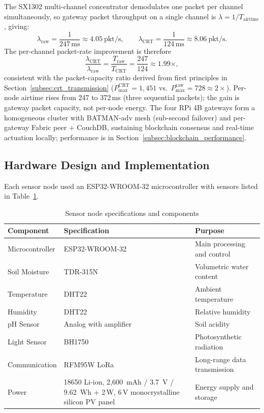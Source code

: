 \documentclass[pdflatex,sn-mathphys-num]{sn-jnl}
\theoremstyle{thmstyleone}
\theoremstyle{thmstyletwo}
\theoremstyle{thmstylethree}
\begin{document}
The SX1302 multi-channel concentrator demodulates one packet per channel simultaneously, so gateway packet throughput on a single channel is $\lambda = 1/T_{\text{airtime}}$, giving:
\begin{equation}
\lambda_{\text{raw}} = \frac{1}{247\,\text{ms}} \approx 4.05\ \text{pkt/s}, \qquad
\lambda_{\text{CRT}} = \frac{1}{124\,\text{ms}} \approx 8.06\ \text{pkt/s}.
\label{eq:packet_rates}
\end{equation}
The per-channel packet-rate improvement is therefore
\begin{equation}
\frac{\lambda_{\text{CRT}}}{\lambda_{\text{raw}}} = \frac{T_{\text{raw}}}{T_{\text{CRT}}} = \frac{247}{124} \approx 1.99\times,
\label{eq:throughput_improvement}
\end{equation}
consistent with the packet-capacity ratio derived from first principles in Section~\ref{subsec:crt_transmission} ($P_{\max}^{\text{CRT}}=1{,}451$ vs.\ $P_{\max}^{\text{raw}}=728 \approx 2\times$). Per-node airtime rises from 247 to 372\,ms (three sequential packets); the gain is gateway packet capacity, not per-node energy. The four RPi 4B gateways form a homogeneous cluster with BATMAN-adv mesh (sub-second failover) and per-gateway Fabric peer + CouchDB, sustaining blockchain consensus and real-time actuation locally; performance is in Section~\ref{subsec:blockchain_performance}.

\subsection{Hardware Design and Implementation}
\label{subsec:hardware}

Each sensor node used an ESP32-WROOM-32 microcontroller \cite{espressif2020esp32} with sensors listed in Table~\ref{tab:sensor-specs}.

\begin{table}[!t]
\centering
\caption{Sensor node specifications and components}
\label{tab:sensor-specs}
\begin{tabularx}{\linewidth}{l X X}
\toprule
\textbf{Component} & \textbf{Specification} & \textbf{Purpose} \\
\midrule
Microcontroller & ESP32-WROOM-32 & Main processing and control \\
Soil Moisture & TDR-315N & Volumetric water content \\
Temperature & DHT22 & Ambient temperature \\
Humidity & DHT22 & Relative humidity \\
pH Sensor & Analog with amplifier & Soil acidity \\
Light Sensor & BH1750 & Photosynthetic radiation \\
Communication & RFM95W LoRa & Long-range data transmission \cite{adafruit2016rfm95w} \\
Power & 18650 Li-ion, 2,600~mAh / 3.7~V / 9.62~Wh + 2\,W, 6\,V monocrystalline silicon PV panel & Energy supply and storage \\
\bottomrule
\end{tabularx}
\end{table}
\end{document}
